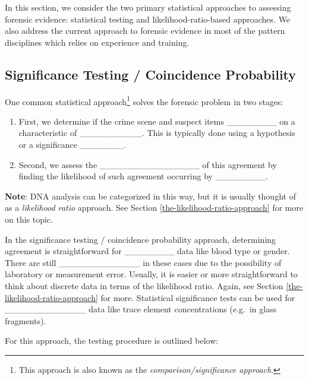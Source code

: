 \documentclass[]{book}
\providecommand{\tightlist}{%
  \setlength{\itemsep}{0pt}\setlength{\parskip}{0pt}}
\let\rmarkdownfootnote\footnote%
\def\footnote{\protect\rmarkdownfootnote}
\theoremstyle{definition}
\theoremstyle{definition}
\theoremstyle{remark}
\begin{document}
In this section, we consider the two primary statistical approaches to
assessing forensic evidence: statistical testing and
likelihood-ratio-based approaches. We also address the current approach
to forensic evidence in most of the pattern disciplines which relies on
experience and training.

\subsection{Significance Testing / Coincidence
Probability}\label{significance-testing-coincidence-probability}

One common statistical approach\footnote{This approach is also known as
  the \emph{comparison/significance approach}.} solves the forensic
problem in two stages:

\begin{enumerate}
\def\labelenumi{\arabic{enumi}.}
\tightlist
\item
  First, we determine if the crime scene and suspect items
  \_\_\_\_\_\_\_\_ on a characteristic of \_\_\_\_\_\_\_\_\_\_. This is
  typically done using a hypothesis or a significance \_\_\_\_\_\_\_.
  \vspace{.1in}
\item
  Second, we assess the \_\_\_\_\_\_\_\_\_\_\_\_\_\_\_\_ of this
  agreement by finding the likelihood of such agreement occurring by
  \_\_\_\_\_\_\_\_.
\end{enumerate}

\textbf{Note}: DNA analysis can be categorized in this way, but it is
usually thought of as a \emph{likelihood ratio} approach. See Section
\ref{the-likelihood-ratio-approach} for more on this topic.

In the significance testing / coincidence probability approach,
determining agreement is straightforward for \_\_\_\_\_\_\_\_ data like
blood type or gender. There are still \_\_\_\_\_\_\_\_\_\_\_\_\_ in
these cases due to the possibility of laboratory or measurement error.
Usually, it is easier or more straightforward to think about discrete
data in terms of the likelihood ratio. Again, see Section
\ref{the-likelihood-ratio-approach} for more. Statistical significance
tests can be used for \_\_\_\_\_\_\_\_\_\_\_\_\_ data like trace element
concentrations (e.g.~in glass fragments).

For this approach, the testing procedure is outlined below:
\vspace{.1in}
\end{document}
